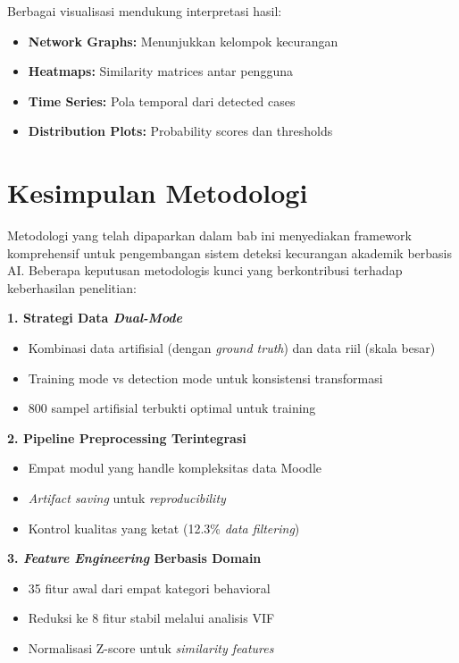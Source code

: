 Berbagai visualisasi mendukung interpretasi hasil:

\begin{itemize}
    \item \textbf{Network Graphs:} Menunjukkan kelompok kecurangan
    \item \textbf{Heatmaps:} Similarity matrices antar pengguna
    \item \textbf{Time Series:} Pola temporal dari detected cases
    \item \textbf{Distribution Plots:} Probability scores dan thresholds
\end{itemize}

\section{Kesimpulan Metodologi}
\label{sec:kesimpulanBab3}

Metodologi yang telah dipaparkan dalam bab ini menyediakan framework komprehensif untuk pengembangan sistem deteksi kecurangan akademik berbasis AI. Beberapa keputusan metodologis kunci yang berkontribusi terhadap keberhasilan penelitian:

\textbf{1. Strategi Data \textit{Dual-Mode}}
\begin{itemize}
    \item Kombinasi data artifisial (dengan \textit{ground truth}) dan data riil (skala besar)
    \item Training mode vs detection mode untuk konsistensi transformasi
    \item 800 sampel artifisial terbukti optimal untuk training
\end{itemize}

\textbf{2. Pipeline Preprocessing Terintegrasi}
\begin{itemize}
    \item Empat modul yang handle kompleksitas data Moodle
    \item \textit{Artifact saving} untuk \textit{reproducibility}
    \item Kontrol kualitas yang ketat (12.3\% \textit{data filtering})
\end{itemize}

\textbf{3. \textit{Feature Engineering} Berbasis Domain}
\begin{itemize}
    \item 35 fitur awal dari empat kategori behavioral
    \item Reduksi ke 8 fitur stabil melalui analisis VIF
    \item Normalisasi Z-score untuk \textit{similarity features}
\end{itemize}

